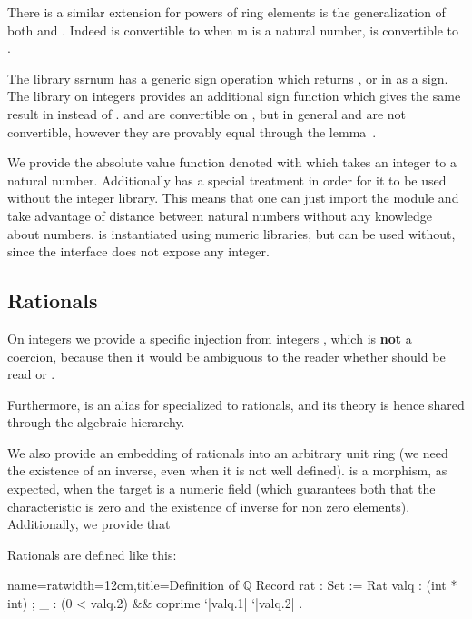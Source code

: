 There is a similar extension for powers of ring elements \C{^} is the
generalization of both \C{^+} and \C{^-}. Indeed  is
convertible to  when m is a natural number, %
 is convertible to .


The library ssrnum has a generic sign operation  which
returns ,  or  in  as a sign. The library on
integers provides an additional sign function  which
gives the same result in  instead of .  and
 are convertible on , but in general  and
 are not convertible, however they are provably equal
through the lemma~.

We provide the absolute value function  denoted with 
which takes an integer to a natural number. Additionally 
has a special treatment in order for it to be used without the integer
library. This means that one can just import the module  and
take advantage of distance between natural numbers without any
knowledge about numbers.  is instantiated using numeric
libraries, but can be used without, since the interface does not
expose any integer.

\subsection{Rationals}
\label{sec:rationals-1}

On integers we provide a specific injection from integers ,
which is \textbf{not} a coercion, because then it would be ambiguous
to the reader whether  should be read  or
.

Furthermore,  is an alias for  specialized to
rationals, and its theory is hence shared through the algebraic
hierarchy.

We also provide an embedding  of rationals into an arbitrary
unit ring (we need the existence of an inverse, even when it is not
well defined).  is a morphism, as expected, when the target is a
numeric field (which guarantees both that the characteristic is zero
and the existence of inverse for non zero elements). Additionally, we
provide that 

Rationals are defined like this:

\vspace{1em}

\begin{coq}{name=rat}{width=12cm,title=Definition of $\mathbb{Q}$}
Record rat : Set := Rat {
  valq : (int * int) ;
  _ : (0 < valq.2) && coprime `|valq.1| `|valq.2|
}.
\end{coq}


